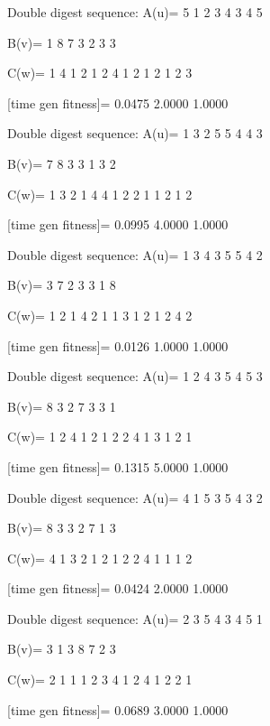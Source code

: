 Double digest sequence:
A(u)=
     5     1     2     3     4     3     4     5

B(v)=
     1     8     7     3     2     3     3

C(w)=
     1     4     1     2     1     2     4     1     2     1     2     1     2     3

[time gen fitness]=
    0.0475    2.0000    1.0000

Double digest sequence:
A(u)=
     1     3     2     5     5     4     4     3

B(v)=
     7     8     3     3     1     3     2

C(w)=
     1     3     2     1     4     4     1     2     2     1     1     2     1     2

[time gen fitness]=
    0.0995    4.0000    1.0000

Double digest sequence:
A(u)=
     1     3     4     3     5     5     4     2

B(v)=
     3     7     2     3     3     1     8

C(w)=
     1     2     1     4     2     1     1     3     1     2     1     2     4     2

[time gen fitness]=
    0.0126    1.0000    1.0000

Double digest sequence:
A(u)=
     1     2     4     3     5     4     5     3

B(v)=
     8     3     2     7     3     3     1

C(w)=
     1     2     4     1     2     1     2     2     4     1     3     1     2     1

[time gen fitness]=
    0.1315    5.0000    1.0000

Double digest sequence:
A(u)=
     4     1     5     3     5     4     3     2

B(v)=
     8     3     3     2     7     1     3

C(w)=
     4     1     3     2     1     2     1     2     2     4     1     1     1     2

[time gen fitness]=
    0.0424    2.0000    1.0000

Double digest sequence:
A(u)=
     2     3     5     4     3     4     5     1

B(v)=
     3     1     3     8     7     2     3

C(w)=
     2     1     1     1     2     3     4     1     2     4     1     2     2     1

[time gen fitness]=
    0.0689    3.0000    1.0000

